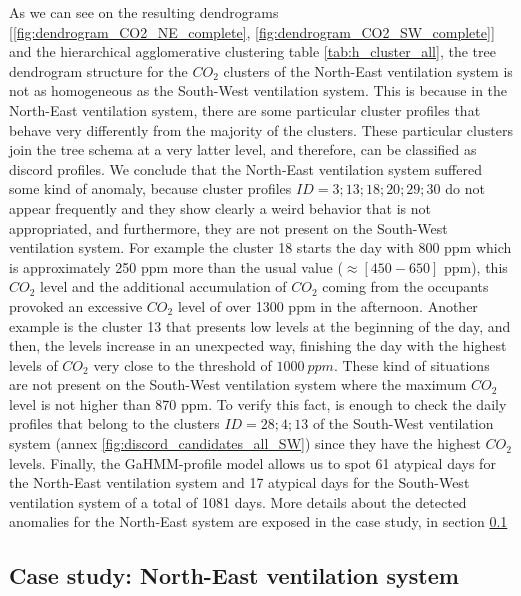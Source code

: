 As we can see on the resulting dendrograms [\ref{fig:dendrogram_CO2_NE_complete}, \ref{fig:dendrogram_CO2_SW_complete}] and the hierarchical agglomerative clustering table {\ref{tab:h_cluster_all}}, the tree dendrogram structure for the $CO_2$ clusters of the North-East ventilation system is not as homogeneous as the South-West ventilation system. This is because in the North-East ventilation system, there are some particular cluster profiles that behave very differently from the majority of the clusters. These particular clusters join the tree schema at a very latter level, and therefore, can be classified as discord profiles. We conclude that the North-East ventilation system suffered some kind of anomaly, because cluster profiles $ID=3; 13; 18; 20; 29; 30$ do not appear frequently and they show clearly a weird behavior that is not appropriated, and furthermore, they are not present on the South-West ventilation system. For example the cluster 18 starts the day with 800 ppm which is approximately 250 ppm more than the usual value ($\approx [450 - 650]$ ppm), this $CO_2$ level and the additional accumulation of $CO_2$ coming from the occupants provoked an excessive $CO_2$ level of over 1300 ppm in the afternoon. Another example is the cluster 13 that presents low levels at the beginning of the day, and then, the levels increase in an unexpected way, finishing the day with the highest levels of $CO_2$ very close to the threshold of $1000 \ ppm$. These kind of situations are not present on the South-West ventilation system where the maximum $CO_2$ level is not higher than 870 ppm. To verify this fact, is enough to check the daily profiles that belong to the clusters $ID = 28; 4; 13$ of the South-West ventilation system (annex \ref{fig:discord_candidates_all_SW}) since they have the highest $CO_2$ levels. Finally, the GaHMM-profile model allows us to spot 61 atypical days for the North-East ventilation system and 17 atypical days for the South-West ventilation system of a total of 1081 days. More details about the detected anomalies for the North-East system are exposed in the case study, in section \ref{section:case_study_1}  \\  


\subsection{Case study:  North-East ventilation system}

\label{section:case_study_1}

